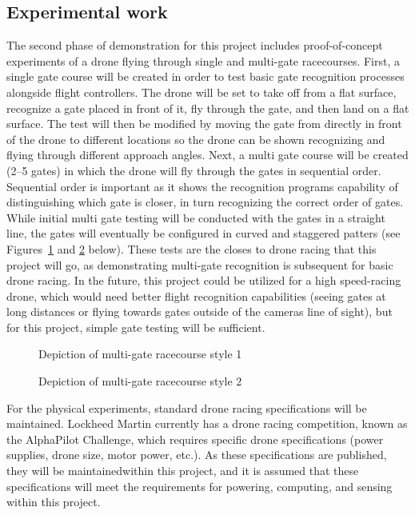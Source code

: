 \documentclass[onecolumn,10pt]{IEEEtran}
\begin{document}
\subsection{Experimental work}
The second phase of demonstration for this project includes proof-of-concept experiments of a drone flying through single and multi-gate racecourses. First, a single gate course will be created in order to test basic gate recognition processes alongside flight controllers. The drone will be set to take off from a flat surface, recognize a gate placed in front of it, fly through the gate, and then land on a flat surface. The test will then be modified by moving the gate from directly in front of the drone to different locations so the drone can be shown recognizing and flying through different approach angles. Next, a multi gate course will be created (2--5 gates) in which the drone will fly through the gates in sequential order. Sequential order is important as it shows the recognition programs capability of distinguishing which gate is closer, in turn recognizing the correct order of gates. While initial multi gate testing will be conducted with the gates in a straight line, the gates will eventually be configured in curved and staggered patters (see Figures~\ref{fig-gate-style-1} and \ref{fig-gate-style-2} below). These tests are the closes to drone racing that this project will go, as demonstrating multi-gate recognition is subsequent for basic drone racing. In the future, this project could be utilized for a high speed-racing drone, which would need better flight recognition capabilities (seeing gates at long distances or flying towards gates outside of the cameras line of sight), but for this project, simple gate testing will be sufficient.
\begin{figure}
\caption{Depiction of multi-gate racecourse style 1}
\label{fig-gate-style-1}
\end{figure}

\begin{figure}
\caption{Depiction of multi-gate racecourse style 2}
\label{fig-gate-style-2}
\end{figure}

For the physical experiments, standard drone racing specifications will be maintained. Lockheed Martin currently has a drone racing competition, known as the AlphaPilot Challenge, which requires specific drone specifications (power supplies, drone size, motor power, etc.). As these specifications are published, they will be maintainedwithin this project, and it is assumed that these specifications will meet the requirements for powering, computing, and sensing within this project.
\end{document}
